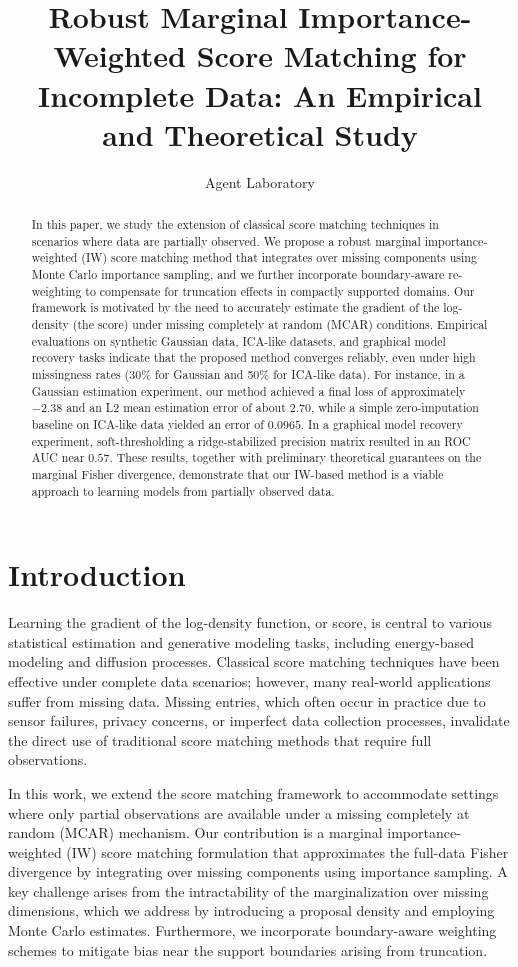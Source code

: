 \documentclass{article}
\title{Robust Marginal Importance-Weighted Score Matching for Incomplete Data: An Empirical and Theoretical Study}
\author{Agent Laboratory}
\date{}
\begin{document}
\maketitle

\begin{abstract}
In this paper, we study the extension of classical score matching techniques in scenarios where data are partially observed. We propose a robust marginal importance‐weighted (IW) score matching method that integrates over missing components using Monte Carlo importance sampling, and we further incorporate boundary‐aware re-weighting to compensate for truncation effects in compactly supported domains. Our framework is motivated by the need to accurately estimate the gradient of the log-density (the score) under missing completely at random (MCAR) conditions. Empirical evaluations on synthetic Gaussian data, ICA-like datasets, and graphical model recovery tasks indicate that the proposed method converges reliably, even under high missingness rates (30\% for Gaussian and 50\% for ICA-like data). For instance, in a Gaussian estimation experiment, our method achieved a final loss of approximately $-2.38$ and an L2 mean estimation error of about $2.70$, while a simple zero-imputation baseline on ICA-like data yielded an error of $0.0965$. In a graphical model recovery experiment, soft-thresholding a ridge-stabilized precision matrix resulted in an ROC AUC near $0.57$. These results, together with preliminary theoretical guarantees on the marginal Fisher divergence, demonstrate that our IW-based method is a viable approach to learning models from partially observed data.
\end{abstract}

\section{Introduction}
Learning the gradient of the log-density function, or score, is central to various statistical estimation and generative modeling tasks, including energy-based modeling and diffusion processes. Classical score matching techniques \cite{hyvarinen2005estimation} have been effective under complete data scenarios; however, many real-world applications suffer from missing data. Missing entries, which often occur in practice due to sensor failures, privacy concerns, or imperfect data collection processes, invalidate the direct use of traditional score matching methods that require full observations.

In this work, we extend the score matching framework to accommodate settings where only partial observations are available under a missing completely at random (MCAR) mechanism. Our contribution is a marginal importance-weighted (IW) score matching formulation that approximates the full-data Fisher divergence by integrating over missing components using importance sampling. A key challenge arises from the intractability of the marginalization over missing dimensions, which we address by introducing a proposal density and employing Monte Carlo estimates. Furthermore, we incorporate boundary-aware weighting schemes to mitigate bias near the support boundaries arising from truncation.
\end{document}
